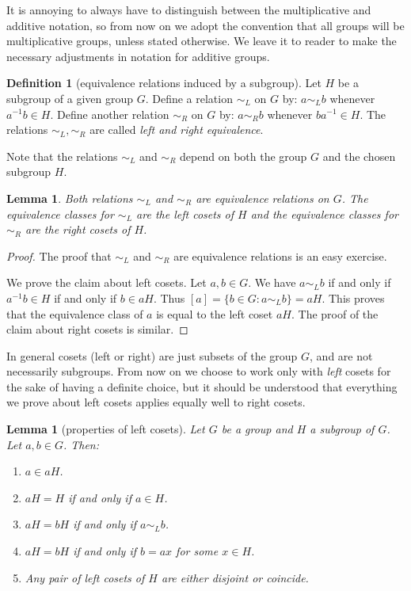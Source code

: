 \documentclass[11pt,oneside]{article}
\newtheorem{lem}[thm]{Lemma}
\theoremstyle{definition}
\newtheorem{defn}[thm]{Definition}
\begin{document}
It is annoying to always have to distinguish between the
multiplicative and additive notation, so from now on we adopt the
convention that all groups will be multiplicative groups, unless
stated otherwise. We leave it to reader to make the necessary
adjustments in notation for additive groups.


\begin{defn}[equivalence relations induced by a subgroup]
\label{def:H-equiv-rels}
Let $H$ be a subgroup of a given group $G$. Define a relation $\sim_L$
on $G$ by: $a \sim_L b$ whenever $a^{-1}b \in H$.  Define another
relation $\sim_R$ on $G$ by: $a \sim_R b$ whenever $ba^{-1} \in H$.
The relations $\sim_L, \sim_R$ are called \emph{left and right
  equivalence}.
\end{defn}

Note that the relations $\sim_L$ and $\sim_R$ depend on both the
group $G$ and the chosen subgroup $H$.

\begin{lem}
Both relations $\sim_L$ and $\sim_R$ are equivalence relations on $G$.
The equivalence classes for $\sim_L$ are the left cosets of $H$ and
the equivalence classes for $\sim_R$ are the right cosets of $H$.
\end{lem}

\begin{proof}
The proof that $\sim_L$ and $\sim_R$ are equivalence relations is an
easy exercise. 

We prove the claim about left cosets.  Let $a,b \in G$. We have $a
\sim_L b$ if and only if $a^{-1}b \in H$ if and only if $b \in
aH$. Thus $[a] = \{b \in G: a \sim_L b \} = aH$. This proves that the
equivalence class of $a$ is equal to the left coset $aH$.  The proof
of the claim about right cosets is similar.
\end{proof}


In general cosets (left or right) are just subsets of the group $G$,
and are not necessarily subgroups.  From now on we choose to work only
with \emph{left} cosets for the sake of having a definite choice, but
it should be understood that everything we prove about left cosets
applies equally well to right cosets.


\begin{lem}[properties of left cosets] \label{cosetlemma} 
Let $G$ be a group and $H$ a subgroup of $G$. Let $a,b \in G$. Then:
\begin{enumerate}
\item $a \in aH$.
\item $aH=H$ if and only if $a\in H$.
\item $aH=bH$ if and only if $a \sim_L b$.
\item $aH=bH$ if and only if $b=ax$ for some $x\in H$.
\item Any pair of left cosets of $H$ are either disjoint or
  coincide.
\end{enumerate}
\end{lem}
\end{document}

